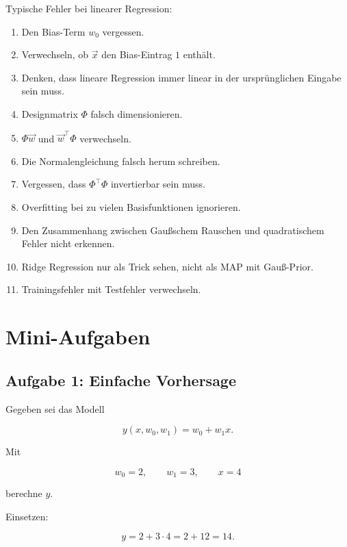\begin{examtipbox}
Typische Fehler bei linearer Regression:

\begin{enumerate}
    \item Den Bias-Term \(w_0\) vergessen.
    \item Verwechseln, ob \(\vec{x}\) den Bias-Eintrag \(1\) enthält.
    \item Denken, dass lineare Regression immer linear in der ursprünglichen Eingabe sein muss.
    \item Designmatrix \(\Phi\) falsch dimensionieren.
    \item \(\Phi\vec{w}\) und \(\vec{w}^{\top}\Phi\) verwechseln.
    \item Die Normalengleichung falsch herum schreiben.
    \item Vergessen, dass \(\Phi^{\top}\Phi\) invertierbar sein muss.
    \item Overfitting bei zu vielen Basisfunktionen ignorieren.
    \item Den Zusammenhang zwischen Gaußschem Rauschen und quadratischem Fehler nicht erkennen.
    \item Ridge Regression nur als Trick sehen, nicht als MAP mit Gauß-Prior.
    \item Trainingsfehler mit Testfehler verwechseln.
\end{enumerate}
\end{examtipbox}

\section{Mini-Aufgaben}

\subsection{Aufgabe 1: Einfache Vorhersage}

Gegeben sei das Modell

\[
    y(x,w_0,w_1)
    =
    w_0+w_1x.
\]

Mit

\[
    w_0=2,
    \qquad
    w_1=3,
    \qquad
    x=4
\]

berechne \(y\).

\begin{examplebox}
Einsetzen:

\[
    y
    =
    2+3\cdot 4
    =
    2+12
    =
    14.
\]
\end{examplebox}

